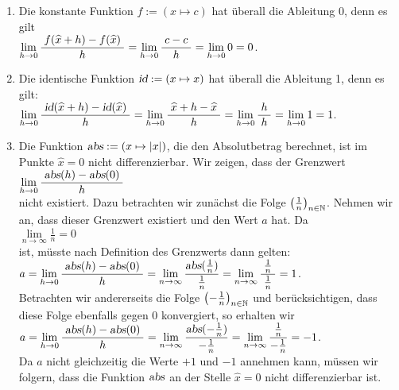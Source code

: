\examples
\begin{enumerate}
\item Die konstante Funktion $f := (x \mapsto c)$ hat \"uberall die Ableitung
      $0$, denn es gilt \\[0.3cm]
      \hspace*{1.3cm}$\lim\limits_{h \rightarrow 0} \displaystyle\frac{\;\displaystyle f(\widehat{x} + h) - f(\widehat{x})\;}{\;\displaystyle h\;} =
\lim\limits_{h \rightarrow 0} \displaystyle\frac{\;\displaystyle c - c\;}{\;\displaystyle h\;} = \lim\limits_{h \rightarrow 0} 0 = 0$.
\item Die identische Funktion $\textsl{id} := (x \mapsto x)$ hat \"uberall die Ableitung 1,
      denn es gilt: 
      \\[0.3cm]
      \hspace*{1.3cm}
      $\lim\limits_{h \rightarrow 0} \displaystyle\frac{\;\displaystyle\textsl{id}(\widehat{x} + h) - \textsl{id}(\widehat{x})\;}{\;\displaystyle h\;} =
       \lim\limits_{h \rightarrow 0} \displaystyle\frac{\;\displaystyle\widehat{x} + h - \widehat{x}\;}{\;\displaystyle h\;} =
       \lim\limits_{h \rightarrow 0} \displaystyle\frac{\;\displaystyle h\;}{\;\displaystyle h\;} = \lim\limits_{h \rightarrow 0} 1 = 1$.
\item Die Funktion $\textsl{abs} := ( x \mapsto |x|)$, die den Absolutbetrag berechnet, ist im
      Punkte $\widehat{x} = 0$ nicht differenzierbar.  Wir zeigen, dass der Grenzwert
      \\[0.3cm]
      \hspace*{1.3cm}
            $\lim\limits_{h \rightarrow 0} \displaystyle\frac{\;\displaystyle\textsl{abs}(h) - \textsl{abs}(0)\;}{\;\displaystyle h\;}$
      \\[0.3cm]
      nicht existiert.  Dazu betrachten wir zun\"achst die Folge $\bigl(\frac{1}{n}\bigr)_{n\in\mathbb{N}}$.
      Nehmen wir an, dass dieser Grenzwert existiert und den Wert $a$ hat.  
      Da \\[0.3cm]
      \hspace*{1.3cm}
      $\lim\limits_{n\rightarrow\infty} \frac{1}{n} = 0$ 
      \\[0.3cm]
      ist, m\"usste nach Definition des Grenzwerts dann gelten: \\[0.3cm]
      \hspace*{1.3cm}
      $a = \displaystyle \lim\limits_{h \rightarrow 0} \displaystyle\frac{\;\displaystyle\textsl{abs}(h) - \textsl{abs}(0)\;}{\;\displaystyle h\;} = 
       \lim\limits_{n\rightarrow\infty} \frac{\textsl{abs}(\frac{1}{n})}{\frac{1}{n}} = 
       \lim\limits_{n\rightarrow\infty} \frac{\;\frac{1}{n}\;}{\frac{1}{n}} = 1 $.
      \\[0.3cm]
      Betrachten wir andererseits die Folge $\bigl(-\frac{1}{n}\bigr)_{n\in\mathbb{N}}$ und ber\"ucksichtigen,
      dass diese Folge ebenfalls gegen 0 konvergiert, so erhalten wir
      \\[0.3cm]
      \hspace*{1.3cm}
      $a = \displaystyle \lim\limits_{h \rightarrow 0} \displaystyle\frac{\;\displaystyle\textsl{abs}(h) - \textsl{abs}(0)\;}{\;\displaystyle h\;} = 
       \lim\limits_{n\rightarrow\infty} \frac{\textsl{abs}(-\frac{1}{n})}{-\frac{1}{n}} = 
       \lim\limits_{n\rightarrow\infty} \frac{\;\frac{1}{n}\;}{-\frac{1}{n}} = -1$.
      \\[0.3cm]
      Da $a$ nicht gleichzeitig die Werte $+1$ und $-1$ annehmen kann, m\"ussen wir folgern,
      dass die Funktion $\textsl{abs}$ an der Stelle $\widehat{x} = 0$ nicht
      differenzierbar ist.  \eox
\end{enumerate}
\pagebreak

